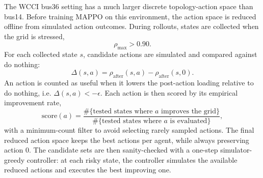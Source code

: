 The WCCI bus36 setting has a much larger discrete topology-action space than
bus14. Before training MAPPO on this environment, the action space is reduced
offline from simulated action outcomes. During rollouts, states are collected
when the grid is stressed,
\[
  \rho_{\max}>0.90.
\]
For each collected state \(s\), candidate actions are simulated and compared
against do nothing:
\[
  \Delta(s,a)=\rho_{\mathrm{after}}(s,a)
  -\rho_{\mathrm{after}}(s,0).
\]
An action is counted as useful when it lowers the post-action loading relative
to do nothing, i.e. \(\Delta(s,a)<-\epsilon\). Each action is then scored by its
empirical improvement rate,
\[
  \mathrm{score}(a)=
  \frac{\#\{\text{tested states where }a\text{ improves the grid}\}}
       {\#\{\text{tested states where }a\text{ is evaluated}\}},
\]
with a minimum-count filter to avoid selecting rarely sampled actions. The final
reduced action space keeps the best actions per agent, while always preserving
action \(0\). The candidate sets are then sanity-checked with a one-step
simulator-greedy controller: at each risky state, the controller simulates the
available reduced actions and executes the best improving one.

\begin{table}[htbp]
  \centering
  \small
  \caption{One-step greedy evaluation of WCCI reduced action spaces on 50
  random test chronics. All rows use the same chronic sample
  (\texttt{chronic\_sample\_seed=0}); the do-nothing mean survival on this
  sample is \(28.30\%\).}
  \label{tab:wcci-h1-greedy-reduced-action-spaces}
  \setlength{\tabcolsep}{4pt}
\end{table}


